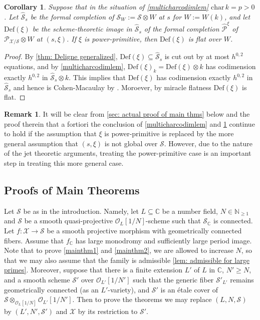\documentclass[letter, 11pt]{article}
\theoremstyle{plain}
\newtheorem{corollary}[subsubsection]{Corollary}
\theoremstyle{definition}
\newtheorem{remark}[subsubsection]{Remark}
\newcommand{\IC}{\mathbb{C}}
\newcommand{\IN}{\mathbb{N}}
\newcommand\tensor{{\otimes}}
\newcommand{\<}{\langle}
\renewcommand{\>}{\rangle}
\newcommand{\sX}{\mathcal{X}}
\newcommand{\sS}{\mathcal{S}}
\newcommand{\sO}{\mathcal{O}}
\newcommand{\shP}{\mathscr{P}}
\newcommand{\Def}{\mathrm{Def}}
\newcommand{\mpr}{}
\begin{document}
\begin{corollary}
\label{cor: power-primitive case}
Suppose that in the situation of \ref{multicharcodimlem} $\mathrm{char\,} k = p > 0$. Let $\hat{\sS}_s$ be the formal completion of $\sS_W := \sS \tensor W$ at $s$ for $W := W(k)$, and let $\Def(\xi)$ be the scheme-theoretic image \mpr{in $\hat{\sS}_s$} of the formal completion $\hat{\shP}^\xi$ of $\shP_{\sX/\sS} \tensor W$ at $(s, \xi)$. If $\xi$ is power-primitive, then $\Def(\xi)$ is flat over $W$. 
\end{corollary}
\begin{proof}
By \ref{thm: Deligne generalized}, $\Def(\xi) \subseteq \hat{\sS}_s$ is cut out by at most $h^{0, 2}$ equations, and by \ref{multicharcodimlem}, $\Def(\xi)_k = \Def(\xi) \tensor k$ has codimension exactly $h^{0, 2}$ in $\hat{\sS}_s \tensor k$. This implies that $\Def(\xi)$ has codimension exactly $h^{0, 2}$ in $\hat{\sS}_s$ and hence is Cohen-Macaulay by \cite[02JN]{stacks-project}. Moroever, by miracle flatness \cite[00R4]{stacks-project} $\Def(\xi)$ is flat. 
\end{proof}


\begin{remark}
    \label{rmk: primitive implies general} It will be clear from \ref{sec: actual proof of main thms} below and the proof therein that a fortiori the conclusion of \ref{multicharcodimlem} and \ref{cor: power-primitive case} continue to hold if the assumption that $\xi$ is power-primitive is replaced by the more general assumption that $(s, \xi)$ is not global over $\sS$. However, due to the nature of the jet theoretic arguments, treating the power-primitive case is an important step in treating this more general case. 
\end{remark}


\subsection{Proofs of Main Theorems} Let $\sS$ be as in the introduction. Namely, let $L \subseteq \IC$ be a number field, $N \in \IN_{\geq 1}$ and $\sS$ be a smooth quasi-projective $\sO_L[1/N]$-scheme such that $\sS_\IC$ is connected. Let $f : \sX \to \sS$ be a smooth projective morphism with geometrically connected fibers. Assume that $f_\IC$ has large monodromy and sufficiently large period image. Note that to prove \ref{mainthm1} and \ref{mainthm2}, we are allowed to increase $N$, so that we may also assume that the family is admissible \ref{lem: admissible for large primes}. Moreover, suppose that there is a finite extension $L'$ of $L$ in $\IC$, $N' \ge N$, and a smooth scheme $\sS'$ over $\sO_{L'}[1/N']$ such that the generic fiber $\sS'_{L'}$ remains geometrically connected (as an $L'$-variety), and $\sS'$ is an \'etale cover of $\sS \tensor_{\sO_L[1/N]} \sO_{L'}[1/N']$. Then to prove the theorems we may replace $(L, N, \sS)$ by $(L', N', \sS')$ and $\sX$ by its restriction to $\sS'$. 
\end{document}
